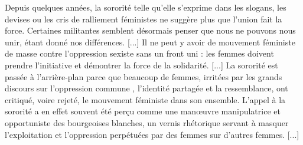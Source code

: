 Depuis quelques années, la \og sororité \fg\; telle qu'elle s'exprime dans les slogans, les devises ou les cris de ralliement féministes ne suggère plus que l'union fait la force. Certaines militantes semblent désormais penser que nous ne pouvons nous unir, étant donné nos différences. 
[...]
Il ne peut y avoir de mouvement féministe de masse contre l'oppression sexiste sans un front uni : les femmes doivent prendre l'initiative et démontrer la force de la solidarité. 
[...]
La sororité est passée à l'arrière-plan parce que beaucoup de femmes, irritées par les grands discours sur \og l'oppression commune \fg, l'identité partagée et la ressemblance, ont critiqué, voire rejeté, le mouvement féministe dans son ensemble.
L'appel à la sororité a en effet souvent été perçu comme une man\oe{}uvre manipulatrice et opportuniste des bourgeoises blanches, un vernis rhétorique servant à masquer l'exploitation et l'oppression perpétuées par des femmes sur d'autres femmes.
[...] \bigskip

